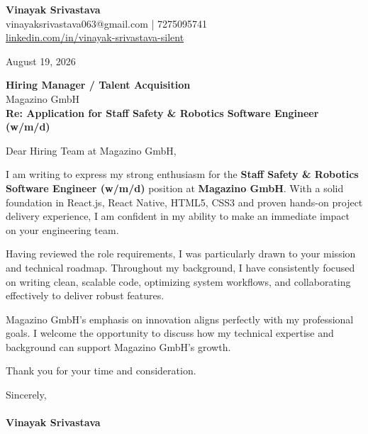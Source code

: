 \documentclass[11pt,a4paper]{article}
\begin{document}
\thispagestyle{empty}

{\Large \textbf{Vinayak Srivastava}}\\
vinayaksrivastava063@gmail.com | 7275095741 \\
\url{linkedin.com/in/vinayak-srivastava-silent}

\vspace{1em}
\hfill August 19, 2026

\textbf{Hiring Manager / Talent Acquisition}\\
Magazino GmbH\\

\vspace{1.5em}
\textbf{Re: Application for Staff Safety & Robotics Software Engineer (w/m/d)}

\vspace{1em}
Dear Hiring Team at Magazino GmbH,

I am writing to express my strong enthusiasm for the \textbf{Staff Safety & Robotics Software Engineer (w/m/d)} position at \textbf{Magazino GmbH}. With a solid foundation in React.js, React Native, HTML5, CSS3 and proven hands-on project delivery experience, I am confident in my ability to make an immediate impact on your engineering team.

Having reviewed the role requirements, I was particularly drawn to your mission and technical roadmap. Throughout my background, I have consistently focused on writing clean, scalable code, optimizing system workflows, and collaborating effectively to deliver robust features.

Magazino GmbH's emphasis on innovation aligns perfectly with my professional goals. I welcome the opportunity to discuss how my technical expertise and background can support Magazino GmbH's growth.

Thank you for your time and consideration.

\vspace{1.5em}
Sincerely,\\
\vspace{1em}\\
\textbf{Vinayak Srivastava}
\end{document}
